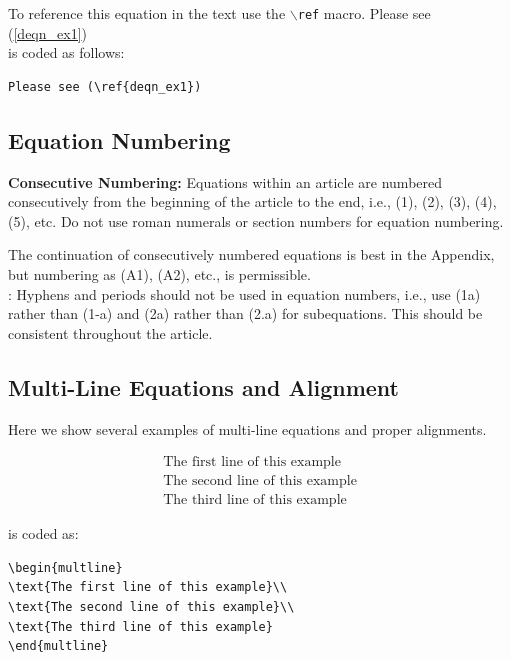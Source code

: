 \documentclass[]{IEEEtran}
\begin{document}
To reference this equation in the text use the $\backslash${\tt{ref}} macro.
Please see (\ref{deqn_ex1})\\
\noindent is coded as follows:
\begin{verbatim}
Please see (\ref{deqn_ex1})\end{verbatim}

\subsection{Equation Numbering}
{\bf{Consecutive Numbering:}} Equations within an article are numbered consecutively from the beginning of the
article to the end, i.e., (1), (2), (3), (4), (5), etc. Do not use roman numerals or section numbers for equation numbering.

 The continuation of consecutively numbered equations is best in the Appendix, but numbering
as (A1), (A2), etc., is permissible.\\

: Hyphens and periods should not be used in equation numbers, i.e., use (1a) rather than
(1-a) and (2a) rather than (2.a) for subequations. This should be consistent throughout the article.

\subsection{Multi-Line Equations and Alignment}
Here we show several examples of multi-line equations and proper alignments.

\begin{multline}
	\text{The first line of this example}\\
	\text{The second line of this example}\\
	\text{The third line of this example}
\end{multline}

\noindent is coded as:
\begin{verbatim}
\begin{multline}
\text{The first line of this example}\\
\text{The second line of this example}\\
\text{The third line of this example}
\end{multline}
\end{verbatim}
\end{document}
